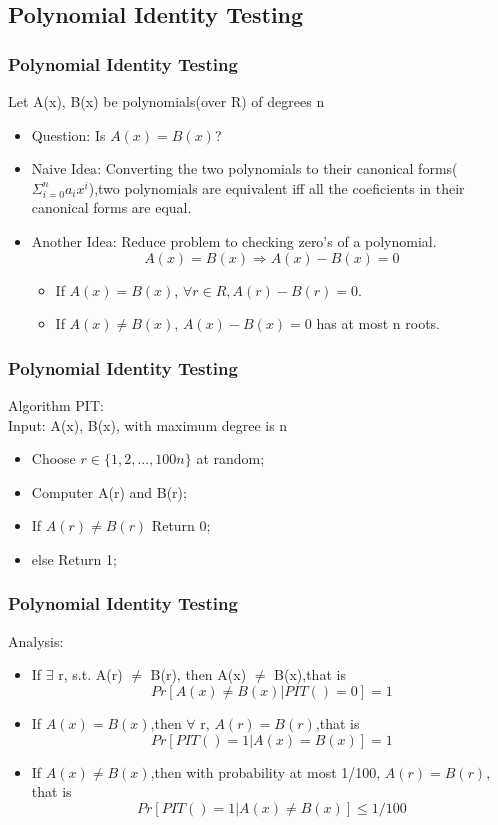 \documentclass{beamer}
\begin{document}
\subsection{Polynomial Identity Testing}
\begin{frame}
\frametitle{Polynomial Identity Testing}
Let A(x), B(x) be polynomials(over R) of degrees n\\
\begin{itemize}
	\item {\color{red} Question}: Is $A(x) = B(x)$?
	\item {\color{red} Naive Idea}: Converting the two polynomials to their canonical forms($\Sigma_{i=0}^{n} a_{i}x^{i}$),two polynomials are equivalent iff all the coeficients in their canonical forms are equal.
	\item {\color{red} Another Idea}: Reduce problem to checking zero’s of a polynomial.
	$$
	A(x) = B(x) \Rightarrow A(x) - B(x) = 0
	$$
	\begin{itemize}
		\item If $A(x) = B(x)$, $\forall r \in R, A(r) - B(r) = 0$.  
		\item If $A(x) \neq B(x)$, $A(x)-B(x) = 0$ has at most n roots.
	\end{itemize}
\end{itemize}

\end{frame}
\begin{frame}
\frametitle{Polynomial Identity Testing}
	{\color{red} Algorithm PIT}:\\
	{\color{red} Input}: A(x), B(x), with maximum degree is n\\
	\begin{itemize}
		\item Choose $r \in \{1,2,...,100n\}$ at random;
		\item Computer A(r) and B(r);
		\item If $A(r) \neq B(r)$ {\color{red} Return} 0;
		\item else {\color{red} Return} 1;
	\end{itemize}
\end{frame}
\begin{frame}
\frametitle{Polynomial Identity Testing}
	{\color{red} Analysis:}
	\begin{itemize}
		\item If $\exists$ r, s.t. A(r) $\neq$ B(r), then A(x) $\neq$ B(x),that is 
		$$Pr[A(x) \neq B(x)|PIT() = 0] = 1$$
		\item If $A(x) = B(x)$,then $\forall$ r, $A(r) = B(r)$,that is
		$$Pr[PIT()=1|A(x) = B(x)] = 1$$
		\item If $A(x) \neq B(x)$,then with probability at most 1/100, $A(r) = B(r)$, that is 
		$$Pr[PIT()=1|A(x) \neq B(x)] \leq 1/100$$
	\end{itemize}
\end{frame}
\end{document}
